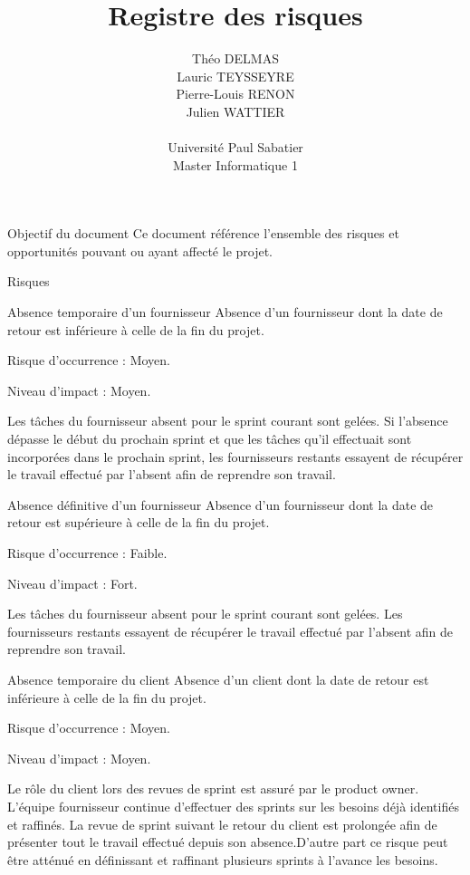 \documentclass[]{article}
\title{Registre des risques}
\author{
    Théo DELMAS\\
    Lauric TEYSSEYRE\\
    Pierre-Louis RENON\\
    Julien WATTIER\\
    \\
    Université Paul Sabatier\\
    Master Informatique 1\\
   }
\begin{document}
\maketitle
\newpage
\tableofcontents
\newpage

\begin{section}{Objectif du document}
 Ce document référence l'ensemble des risques et opportunités pouvant ou ayant affecté le projet.
\end{section}

{
\setlength{\parindent}{0pt} %
\begin{section}{Risques}
 \begin{subsection}{Absence temporaire d'un fournisseur}
     Absence d'un fournisseur dont la date de retour est inférieure à celle de la fin du projet.

     Risque d’occurrence : Moyen.

     Niveau d’impact : Moyen.

     Les tâches du fournisseur absent pour le sprint courant sont gelées. Si l'absence dépasse le début du prochain sprint et que les tâches qu'il effectuait sont incorporées dans le prochain sprint, les fournisseurs restants essayent de récupérer le travail effectué par l'absent afin de reprendre son travail.
 \end{subsection}

 \begin{subsection}{Absence définitive d'un fournisseur}
     Absence d'un fournisseur dont la date de retour est supérieure à celle de la fin du projet.

     Risque d’occurrence : Faible.

     Niveau d’impact : Fort.

     Les tâches du fournisseur absent pour le sprint courant sont gelées. Les fournisseurs restants essayent de récupérer le travail effectué par l'absent afin de reprendre son travail.
 \end{subsection}

 \begin{subsection}{Absence temporaire du client}
     Absence d'un client dont la date de retour est inférieure à celle de la fin du projet.

     Risque d’occurrence : Moyen.

     Niveau d’impact : Moyen.

     Le rôle du client lors des revues de sprint est assuré par le product owner. L'équipe fournisseur continue d'effectuer des sprints sur les besoins déjà identifiés et raffinés. La revue de sprint suivant le retour du client est prolongée afin de présenter tout le travail effectué depuis son absence.D'autre part ce risque peut être atténué en définissant et raffinant plusieurs sprints à l'avance les besoins.
 \end{subsection}


\end{section}}
\end{document}

